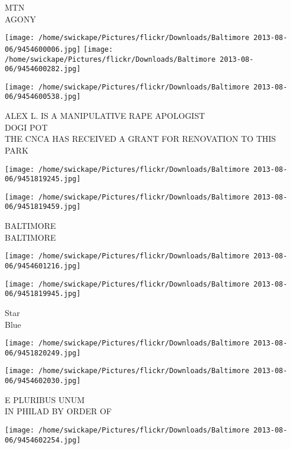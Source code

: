 \documentclass[10pt,letterpaper]{article}
\begin{document}
MTN\\
AGONY\\
\pagebreak

\texttt{[image: /home/swickape/Pictures/flickr/Downloads/Baltimore 2013-08-06/9454600006.jpg]}
\texttt{[image: /home/swickape/Pictures/flickr/Downloads/Baltimore 2013-08-06/9454600282.jpg]}

\vspace{0.25in}
\texttt{[image: /home/swickape/Pictures/flickr/Downloads/Baltimore 2013-08-06/9454600538.jpg]}

ALEX L. IS A MANIPULATIVE RAPE APOLOGIST\\
DOGI POT\\
THE CNCA HAS RECEIVED A GRANT FOR RENOVATION TO THIS PARK\\
\pagebreak

\texttt{[image: /home/swickape/Pictures/flickr/Downloads/Baltimore 2013-08-06/9451819245.jpg]}

\vspace{0.25in}
\texttt{[image: /home/swickape/Pictures/flickr/Downloads/Baltimore 2013-08-06/9451819459.jpg]}

BALTIMORE\\
BALTIMORE\\
\pagebreak

\texttt{[image: /home/swickape/Pictures/flickr/Downloads/Baltimore 2013-08-06/9454601216.jpg]}

\vspace{0.25in}
\texttt{[image: /home/swickape/Pictures/flickr/Downloads/Baltimore 2013-08-06/9451819945.jpg]}

Star\\
Blue\\
\pagebreak

\texttt{[image: /home/swickape/Pictures/flickr/Downloads/Baltimore 2013-08-06/9451820249.jpg]}

\vspace{0.25in}
\texttt{[image: /home/swickape/Pictures/flickr/Downloads/Baltimore 2013-08-06/9454602030.jpg]}

E PLURIBUS UNUM\\
IN PHILAD BY ORDER OF\\
\pagebreak

\texttt{[image: /home/swickape/Pictures/flickr/Downloads/Baltimore 2013-08-06/9454602254.jpg]}
\end{document}
